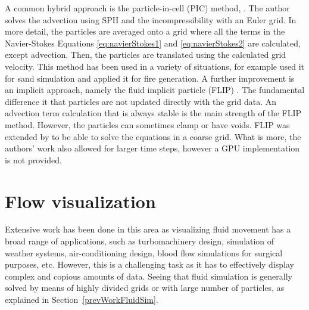 A common hybrid approach is the particle-in-cell (PIC) method, \cite{Harlow1962}.
The author solves the advection using SPH and the incompressibility with an Euler grid.
In more detail, the particles are averaged onto a grid where all the terms in the Navier-Stokes Equations \ref{eq:navierStokes1} and \ref{eq:navierStokes2} are calculated, except advection.
Then, the particles are translated using the calculated grid velocity.
This method has been used in a variety of situations, for example \cite{Zhu2005} used it for sand simulation and \cite{Horvath2009} applied it for fire generation.
A further improvement is an implicit approach, namely the fluid implicit particle (FLIP) \cite{J.U.Brackbill1986}.
The fundamental difference it that particles are not updated directly with the grid data.
An advection term calculation that is always stable is the main strength of the FLIP method.
However, the particles can sometimes clamp or have voids.
FLIP was extended by \cite{Raveendran2011} to be able to solve the equations in a coarse grid.
What is more, the authors' work also allowed for larger time steps, however a GPU implementation is not provided.

\section{Flow visualization}
\label{sec:flowVisualization}


Extensive work has been done in this area as visualizing fluid movement has a broad range of applications, such as turbomachinery design, simulation of weather systems, air-conditioning design, blood flow simulations for surgical purposes, etc.
However, this is a challenging task as it has to effectively display complex and copious amounts of data.
Seeing that fluid simulation is generally solved by means of highly divided grids or with large number of particles, as explained in Section~\ref{prevWorkFluidSim}.

